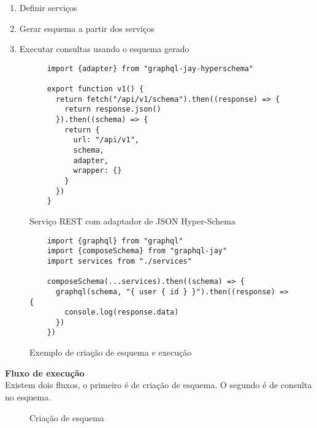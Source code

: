 \begin{enumerate}
\item Definir serviços
\item Gerar esquema a partir dos serviços
\item Executar consultas usando o esquema gerado
\end{enumerate}

\begin{figure}[H]
  \centering
  \begin{verbatim}
    import {adapter} from "graphql-jay-hyperschema"
  
    export function v1() {
      return fetch("/api/v1/schema").then((response) => {
        return response.json()
      }).then((schema) => {
        return {
          url: "/api/v1",
          schema,
          adapter,
          wrapper: {}
        }
      })
    }
  \end{verbatim}
  \caption{Serviço REST com adaptador de JSON Hyper-Schema}
\end{figure}

\begin{figure}[H]
  \centering
  \begin{verbatim}
    import {graphql} from "graphql"
    import {composeSchema} from "graphql-jay"
    import services from "./services"
    
    composeSchema(...services).then((schema) => {
      graphql(schema, "{ user { id } }").then((response) => { 
        console.log(response.data)
      })
    })
  \end{verbatim}
  \caption{Exemplo de criação de esquema e execução}
\end{figure}

\textbf{Fluxo de execução} \\

Existem dois fluxos, o primeiro é de criação de esquema. O segundo é de consulta no esquema.

\begin{figure}[H]
  \centering
  \caption{Criação de esquema}
\end{figure}

